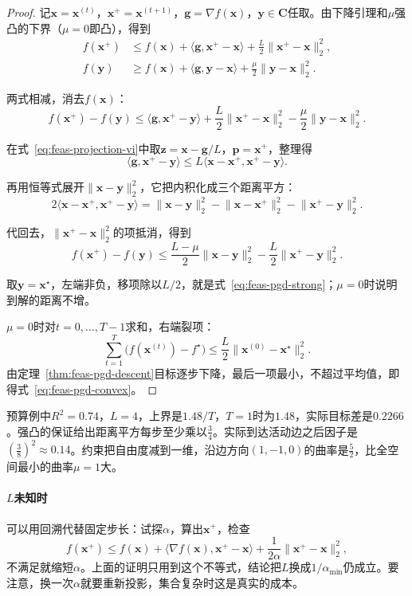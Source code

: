 \begin{proof}
记$\bm{x}=\bm{x}^{(t)}$，$\bm{x}^{+}=\bm{x}^{(t+1)}$，$\bm{g}=\nabla f(\bm{x})$，$\bm{y}\in\bm{C}$任取。由下降引理和$\mu$强凸的下界（$\mu=0$即凸），得到
\[
 \begin{aligned}
 f(\bm{x}^{+})&\leq f(\bm{x})+\langle\bm{g},\bm{x}^{+}-\bm{x}\rangle+\frac L2\lVert\bm{x}^{+}-\bm{x}\rVert_2^2,\\
 f(\bm{y})&\geq f(\bm{x})+\langle\bm{g},\bm{y}-\bm{x}\rangle+\frac\mu2\lVert\bm{y}-\bm{x}\rVert_2^2.
 \end{aligned}
\]

两式相减，消去$f(\bm{x})$：
\[
 f(\bm{x}^{+})-f(\bm{y})\leq\langle\bm{g},\bm{x}^{+}-\bm{y}\rangle+\frac L2\lVert\bm{x}^{+}-\bm{x}\rVert_2^2-\frac\mu2\lVert\bm{y}-\bm{x}\rVert_2^2.
\]

在式~\eqref{eq:feas-projection-vi}中取$\bm{z}=\bm{x}-\bm{g}/L$，$\bm{p}=\bm{x}^{+}$，整理得
\[
 \langle\bm{g},\bm{x}^{+}-\bm{y}\rangle\leq L\langle\bm{x}-\bm{x}^{+},\bm{x}^{+}-\bm{y}\rangle.
\]

再用恒等式展开$\lVert\bm{x}-\bm{y}\rVert_2^2$，它把内积化成三个距离平方：
\[
 2\langle\bm{x}-\bm{x}^{+},\bm{x}^{+}-\bm{y}\rangle
 =\lVert\bm{x}-\bm{y}\rVert_2^2-\lVert\bm{x}-\bm{x}^{+}\rVert_2^2-\lVert\bm{x}^{+}-\bm{y}\rVert_2^2.
\]

代回去，$\lVert\bm{x}^{+}-\bm{x}\rVert_2^2$的项抵消，得到
\[
 f(\bm{x}^{+})-f(\bm{y})\leq\frac{L-\mu}{2}\lVert\bm{x}-\bm{y}\rVert_2^2-\frac L2\lVert\bm{x}^{+}-\bm{y}\rVert_2^2.
\]

取$\bm{y}=\bm{x}^\star$，左端非负，移项除以$L/2$，就是式~\eqref{eq:feas-pgd-strong}；$\mu=0$时说明到解的距离不增。

$\mu=0$时对$t=0,\ldots,T-1$求和，右端裂项：
\[
 \sum_{t=1}^T\bigl(f(\bm{x}^{(t)})-f^\star\bigr)\leq\frac L2\lVert\bm{x}^{(0)}-\bm{x}^\star\rVert_2^2.
\]
由定理~\ref{thm:feas-pgd-descent}目标逐步下降，最后一项最小，不超过平均值，即得式~\eqref{eq:feas-pgd-convex}。
\end{proof}

预算例中$R^2=0.74$，$L=4$，上界是$1.48/T$，$T=1$时为$1.48$，实际目标差是$0.2266$。强凸的保证给出距离平方每步至少乘以$\tfrac34$。实际到达活动边之后因子是$(\tfrac38)^2\approx0.14$。约束把自由度减到一维，沿边方向$(1,-1,0)$的曲率是$\tfrac52$，比全空间最小的曲率$\mu=1$大。

\paragraph{$L$未知时}
可以用回溯代替固定步长：试探$\alpha$，算出$\bm{x}^{+}$，检查
\[
 f(\bm{x}^{+})\leq f(\bm{x})+\langle\nabla f(\bm{x}),\bm{x}^{+}-\bm{x}\rangle+\frac{1}{2\alpha}\lVert\bm{x}^{+}-\bm{x}\rVert_2^2,
\]
不满足就缩短$\alpha$。上面的证明只用到这个不等式，结论把$L$换成$1/\alpha_{\min}$仍成立。要注意，换一次$\alpha$就要重新投影，集合复杂时这是真实的成本。

